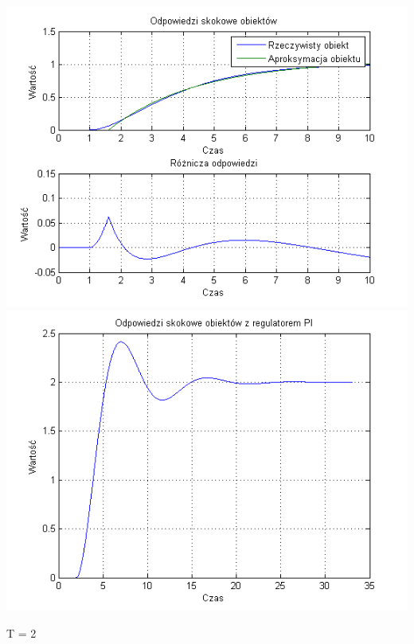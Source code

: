 \documentclass[10pt,a4paper]{article}
\begin{document}
\begin{center}
\includegraphics[scale=1]{images/jeden/skrypt_63.png}\\
\includegraphics[scale=1]{images/jeden/skrypt_64.png}\\
\end{center}
\newpage
T = 2
\end{document}
